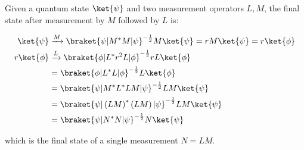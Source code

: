 \par Given a quantum state $\ket{\psi}$ and two measurement operators $L, M$,
the final state after measurement by $M$ followed by $L$ is:

\begin{align}
\ket{\psi} &\xrightarrow{M} \braket{\psi | M^* M | \psi}^{-\frac12} M \ket{\psi} =
r M \ket{\psi}  = r \ket{\phi} \\
r \ket{\phi} &\xrightarrow{L} \braket{\phi | L^* r^2 L | \phi}^{-\frac12} r L
\ket{\phi} \\
&= \braket{\phi | L^* L | \phi}^{-\frac12} L \ket{\phi} \\
&= \braket{\psi | M^* L^* L M | \psi}^{-\frac12} L M \ket{\psi} \\
&= \braket{\psi | \left( L M \right)^* \left( L M \right) | \psi}^{-\frac12} L M
\ket{\psi} \\
&= \braket{\psi | N^* N | \psi}^{-\frac12} N \ket{\psi}
\end{align}

which is the final state of a single measurement $N = L M$.
